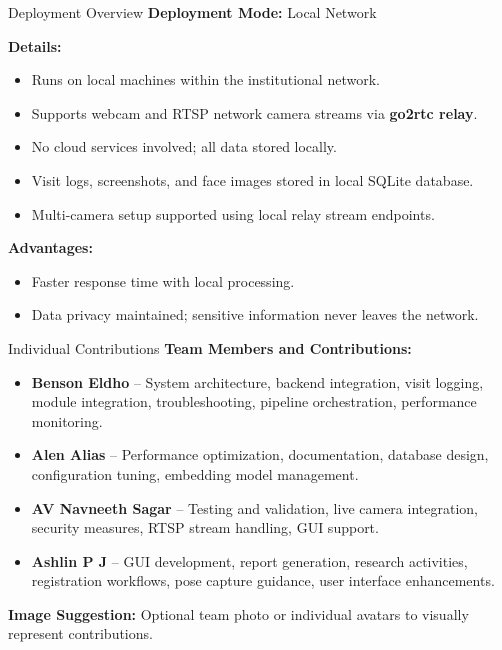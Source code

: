 \documentclass[10pt]{beamer}
\begin{document}
\begin{frame}{Deployment Overview}
    \textbf{Deployment Mode:} Local Network

    \vspace{0.3cm}
    \textbf{Details:}
    \begin{itemize}
        \item Runs on local machines within the institutional network.
        \item Supports webcam and RTSP network camera streams via \textbf{go2rtc relay}.
        \item No cloud services involved; all data stored locally.
        \item Visit logs, screenshots, and face images stored in local SQLite database.
        \item Multi-camera setup supported using local relay stream endpoints.
    \end{itemize}

    \vspace{0.3cm}
    \textbf{Advantages:}
    \begin{itemize}
        \item Faster response time with local processing.
        \item Data privacy maintained; sensitive information never leaves the network.
    \end{itemize}
\end{frame}
\begin{frame}{Individual Contributions}
    \textbf{Team Members and Contributions:}

    \begin{itemize}
        \item \textbf{Benson Eldho} – System architecture, backend integration, visit logging, module integration, troubleshooting, pipeline orchestration, performance monitoring.
        \item \textbf{Alen Alias} – Performance optimization, documentation, database design, configuration tuning, embedding model management.
        \item \textbf{AV Navneeth Sagar} – Testing and validation, live camera integration, security measures, RTSP stream handling, GUI support.
        \item \textbf{Ashlin P J} – GUI development, report generation, research activities, registration workflows, pose capture guidance, user interface enhancements.
    \end{itemize}

    \vspace{0.3cm}
    \textbf{Image Suggestion:} Optional team photo or individual avatars to visually represent contributions.
\end{frame}
\end{document}
